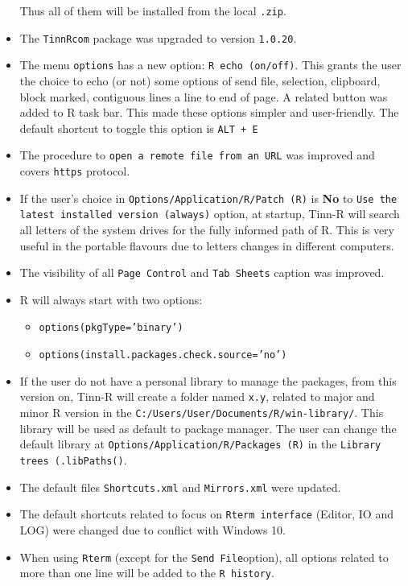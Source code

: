 \begin{itemize}
    Thus all of them will be installed from the local \texttt{.zip}.
  \item The \texttt{TinnRcom} package was upgraded to version \texttt{1.0.20}.
  \item The menu \texttt{options} has a new option: \texttt{R echo (on/off)}. This grants the user the choice to echo (or not)
    some options of send file, selection, clipboard, block marked, contiguous lines a line to end of page.
    A related button was added to R task bar. This made these options simpler and user-friendly.
    The default shortcut to toggle this option is \texttt{ALT + E}
  \item The procedure to \texttt{open a remote file from an URL} was improved and covers \texttt{https} protocol.
  \item If the user's choice in \texttt{Options/Application/R/Patch (R)} is
    \textbf{No} to \texttt{Use the latest installed version (always)} option, at startup,
    Tinn-R will search all letters of the system drives for the fully informed path of R.
    This is very useful in the portable flavours due to letters changes in different computers.
  \item The visibility of all \texttt{Page Control} and \texttt{Tab Sheets} caption was improved.
  \item R will always start with two options:
    \begin{itemize}
      \item \texttt{options(pkgType='binary')}
      \item \texttt{options(install.packages.check.source='no')}
    \end{itemize}
  \item If the user do not have a personal library to manage the packages,
    from this version on, Tinn-R will create a folder named \texttt{x.y}, related to major and minor R version in the \texttt{C:/Users/User/Documents/R/win-library/}.
    This library will be used as default to package manager. The user can change the default library at
    \texttt{Options/Application/R/Packages (R)} in the \texttt{Library trees (.libPaths()}.
  \item The default files \texttt{Shortcuts.xml} and \texttt{Mirrors.xml} were updated.
  \item The default shortcuts related to focus on \texttt{Rterm interface} (Editor, IO and LOG) were changed
    due to conflict with Windows 10.
  \item When using \texttt{Rterm} (except for the \texttt{Send File}option), all options related to more than one line will be added to the \texttt{R history}.

\end{itemize}
